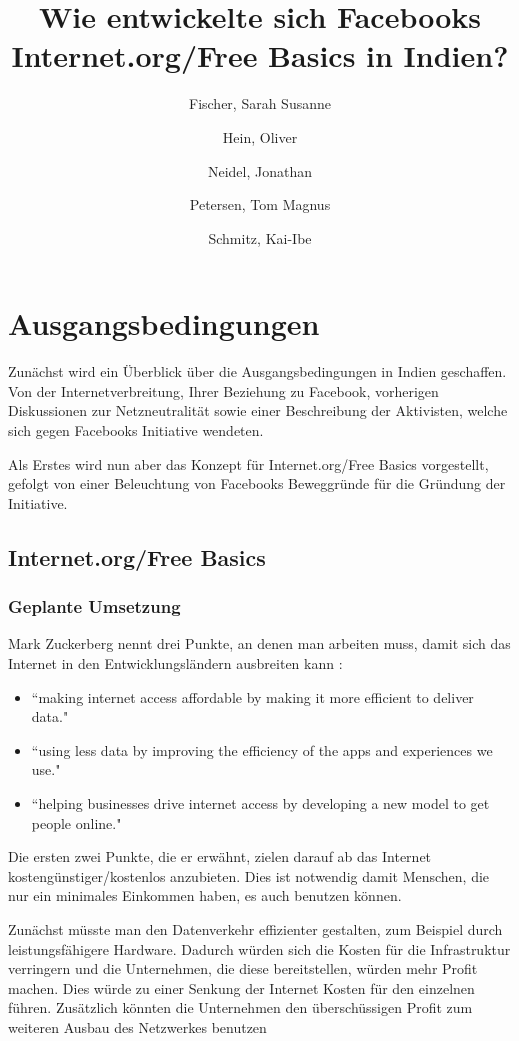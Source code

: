 \documentclass{article}
\title{Wie entwickelte sich Facebooks Internet.org/Free Basics in Indien?}
\author{
  Fischer, Sarah Susanne\\
  \and
  Hein, Oliver\\
  \and
  Neidel, Jonathan\\
  \and
  Petersen, Tom Magnus\\
  \and
  Schmitz, Kai-Ibe\\
}
\begin{document}
\maketitle

\section{Ausgangsbedingungen}

Zunächst wird ein Überblick über die Ausgangsbedingungen in Indien geschaffen. Von der Internetverbreitung, Ihrer Beziehung zu Facebook, vorherigen Diskussionen zur Netzneutralität sowie einer Beschreibung der Aktivisten, welche sich gegen Facebooks Initiative wendeten.

Als Erstes wird nun aber das Konzept für Internet.org/Free Basics vorgestellt, gefolgt von einer Beleuchtung von Facebooks Beweggründe für die Gründung der Initiative.

\subsection{Internet.org/Free Basics}

\subsubsection{Geplante Umsetzung}
        
Mark Zuckerberg nennt drei Punkte, an denen man arbeiten muss, damit sich das Internet in den Entwicklungsländern ausbreiten kann
\parencite{HumanRight}:
\begin{itemize}
\item ``making internet access affordable by making it more efficient to deliver data."

\item ``using less data by improving the efficiency of the apps and experiences we use."

\item ``helping businesses drive internet access by developing a new model to get people online."  
\end{itemize}

Die ersten zwei Punkte, die er erwähnt, zielen darauf ab das Internet kostengünstiger/kostenlos anzubieten. 
Dies ist notwendig damit Menschen, die nur ein minimales Einkommen haben, es auch benutzen können.
\medskip

Zunächst müsste man den Datenverkehr effizienter gestalten, zum Beispiel durch leistungsfähigere Hardware.
Dadurch würden sich die Kosten für die Infrastruktur verringern und die Unternehmen, die diese bereitstellen, würden mehr Profit    
machen. Dies würde zu einer Senkung der Internet Kosten für den einzelnen führen.
Zusätzlich könnten die Unternehmen den überschüssigen Profit zum weiteren Ausbau des Netzwerkes benutzen\\
\end{document}
